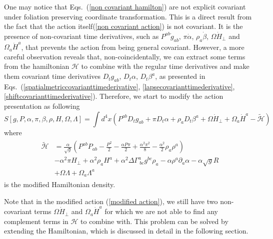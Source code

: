 One may notice that Eqs.~(\ref{non covariant hamilton}) are not explicit covariant under foliation preserving coordinate transformation. This is a direct result from the fact that the action itself(\ref{non covariant action}) is not covariant. It is the presence of non-covariant time derivatives, such as $P^{ab}{\dot g}_{ab}$, $\pi{\dot \alpha}$, $\rho_{a}{\dot \beta}$, $\Omega{\dot H}_{\perp}$ and $\Omega_{a}{\dot H}^{a}$, that prevents the action from being general covariant. However, a more careful observation reveals that, non-coincidentally, we can extract some terms from the hamiltonian $\mathscr{H}$ to combine with the regular time derivatives and make them covariant time derivatives $D_{t}g_{ab}$, $D_{t}\alpha$, $D_{t}\beta^{a}$, as presented in Eqs.~(\ref{spatialmetriccovarianttimederivative}, \ref{lapsecovarianttimederivative}, \ref{shiftcovarianttimederivative}). Therefore, we start to modify the action presentation as following
\begin{equation}\label{modified action}
S[g, P, \alpha, \pi, \beta, \rho, H, \Omega, \Lambda ] = \int d^{4}x \left( P^{ab}D_{t}g_{ab} + \pi D_{t}\alpha + \rho_{a}D_{t}\beta^{a} + \Omega {\dot H}_{\perp} + \Omega_{a}{\dot H}^{a} - \tilde{\mathscr{H}}\right)
\end{equation}
where
\begin{align}
\begin{split}
\tilde{\mathscr{H}} & = \frac{\alpha}{\sqrt{g}}\left(P^{ab}P_{ab} - \frac{P^{2}}{2} - \frac{\alpha P \pi}{2} + \frac{\alpha^{2}\pi^{2}}{8} - \frac{\alpha^{2}}{2}\rho_{a}\rho^{a}\right)\\
& -\alpha^{2}\pi H_{\perp} + \alpha^{2}\rho_{a}H^{a} + \alpha^{2}\Delta\Gamma^{a}_{~bc}g^{bc}\rho_{a} - \alpha \rho^{a}\partial_{a}\alpha - \alpha\sqrt{g}R\\
& + \Omega \Lambda + \Omega_{a}\Lambda^{a}
\end{split}
\end{align}
is the modified Hamiltonian density. 

Note that in the modified action (\ref{modified action}), we still have two non-covariant terms $\Omega {\dot H}_{\perp}$ and $\Omega_{a}{\dot H}^{a}$ for which we are not able to find any complement terms in $\mathscr{H}$ to combine with. This problem can be solved by extending the Hamiltonian, which is discussed in detail in the following section. 
